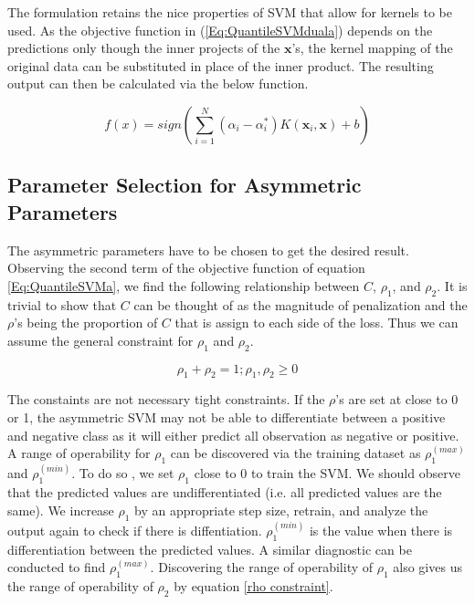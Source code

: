 \documentclass[twoside,11pt]{article}
\begin{document}
The formulation retains the nice properties of SVM that allow for kernels to be used. As the objective function in (\ref{Eq:QuantileSVMduala}) depends on the predictions only though the inner projects of the $\mathbf{x}$'s, the kernel mapping of the original data can be substituted in place of the inner product. The resulting output can then be calculated via the below function. 

\begin{equation}\label{finalpredictioneqn2}
f(x)=sign(\displaystyle\sum_{i=1}^N (\alpha_i - \alpha_i^*)K(\mathbf{x}_i,\mathbf{x})+b)
\end{equation}

\subsection{Parameter Selection for Asymmetric Parameters}
The asymmetric parameters have to be chosen to get the desired result. Observing the second term of the objective function of equation \ref{Eq:QuantileSVMa}, we find the following relationship between $C$, $\rho_1$, and $\rho_2$. It is trivial to show that $C$ can be thought of as the magnitude of penalization and the $\rho$'s being the proportion of $C$ that is assign to each side of the loss. Thus we can assume the general constraint for $\rho_1$ and $\rho_2$.

\begin{equation}\label{rho constraint}
\rho_1 + \rho_2 =1; \rho_1,\rho_2 \geq 0
\end{equation}

The constaints are not necessary tight constraints. If the $\rho$'s are set at close to 0 or 1, the asymmetric SVM may not be able to differentiate between a positive and negative class as it will either predict all observation as negative or positive. A range of operability for $\rho_1$ can be discovered via the training dataset as $\rho_1^{(max)}$ and $\rho_1^{(min)}$. To do so , we set $\rho_1$ close to 0 to train the SVM. We should observe that the predicted values are undifferentiated (i.e. all predicted values are the same). We increase $\rho_1$ by an appropriate step size, retrain, and analyze the output again to check if there is diffentiation. $\rho_1^{(min)}$ is the value when there is differentiation between the predicted values. A similar diagnostic can be conducted to find $\rho_1^{(max)}$. Discovering the range of operability of $\rho_1$ also gives us the range of operability of $\rho_2$ by equation \ref{rho constraint}.
\end{document}
